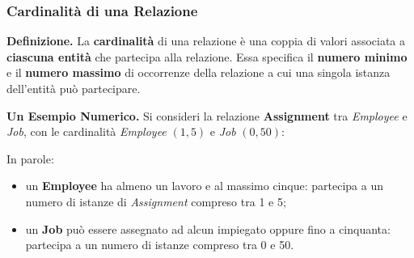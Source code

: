 \documentclass[12pt]{extarticle}
\begin{document}
\subsubsection{Cardinalità di una Relazione}

\noindent \textbf{Definizione.} La \textbf{cardinalità} di una relazione è una coppia di valori associata a \textbf{ciascuna entità} che partecipa alla relazione. Essa specifica il \textbf{numero minimo} e il \textbf{numero massimo} di occorrenze della relazione a cui una singola istanza dell'entità può partecipare.

\medskip
\noindent \textbf{Un Esempio Numerico.} Si consideri la relazione \textbf{Assignment} tra \textit{Employee} e \textit{Job}, con le cardinalità \textit{Employee} $(1,5)$ e \textit{Job} $(0,50)$:

\begin{center}
\end{center}

\noindent In parole:
\begin{itemize}
    \item un \textbf{Employee} ha almeno un lavoro e al massimo cinque: partecipa a un numero di istanze di \textit{Assignment} compreso tra 1 e 5;
    \item un \textbf{Job} può essere assegnato ad alcun impiegato oppure fino a cinquanta: partecipa a un numero di istanze compreso tra 0 e 50.
\end{itemize}
\end{document}
